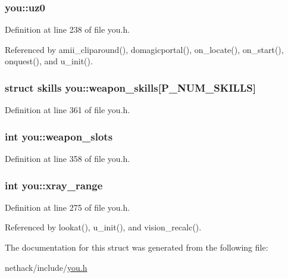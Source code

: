 \hypertarget{structyou_a91637ade745880be0af66e4c0b0ff1c1}{
\subsubsection[{uz0}]{ you\+::uz0}}\label{structyou_a91637ade745880be0af66e4c0b0ff1c1}


Definition at line 238 of file you.\+h.



Referenced by amii\+\_\+cliparound(), domagicportal(), on\+\_\+locate(), on\+\_\+start(), onquest(), and u\+\_\+init().

\hypertarget{structyou_a15a56de7ee4ff4f8166b119ee2c92d98}{
\subsubsection[{weapon\+\_\+skills}]{\setlength{\rightskip}{0pt plus 5cm}struct {\bf skills} you\+::weapon\+\_\+skills\mbox{[}{\bf P\+\_\+\+N\+U\+M\+\_\+\+S\+K\+I\+L\+L\+S}\mbox{]}}}\label{structyou_a15a56de7ee4ff4f8166b119ee2c92d98}


Definition at line 361 of file you.\+h.

\hypertarget{structyou_af33d1854333dc6d8156b1b92a49742e0}{
\subsubsection[{weapon\+\_\+slots}]{\setlength{\rightskip}{0pt plus 5cm}int you\+::weapon\+\_\+slots}}\label{structyou_af33d1854333dc6d8156b1b92a49742e0}


Definition at line 358 of file you.\+h.

\hypertarget{structyou_a2f16ef4e943639c15ba3f8a9701267d2}{
\subsubsection[{xray\+\_\+range}]{\setlength{\rightskip}{0pt plus 5cm}int you\+::xray\+\_\+range}}\label{structyou_a2f16ef4e943639c15ba3f8a9701267d2}


Definition at line 275 of file you.\+h.



Referenced by lookat(), u\+\_\+init(), and vision\+\_\+recalc().



The documentation for this struct was generated from the following file\+:\begin{DoxyCompactItemize}
\item 
nethack/include/\hyperlink{you_8h}{you.\+h}\end{DoxyCompactItemize}

